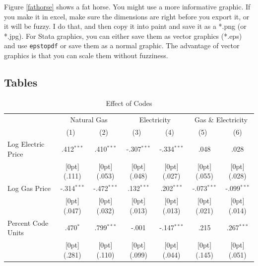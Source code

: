 \documentclass[10pt]{article}
\begin{document}
Figure \ref{fathorse} shows a fat horse.  You might use a more informative graphic.  If you make it in excel, make sure the dimensions are right before you export it, or it will be fuzzy.  I do that, and then copy it into paint and save it as a *.png (or *.jpg).  For Stata graphics, you can either save them as vector graphics (*.eps) and use \texttt{epstopdf} or save them as a normal graphic.  The advantage of vector graphics is that you can scale them without fuzziness.

\subsection{Tables}

\begin{table}[h!]\footnotesize
\caption{Effect of Codes}
\label{main}
\begin{tabular*}{\textwidth}{@{\extracolsep{\fill}}lcccccc}	\toprule	
& \multicolumn{2}{c}{Natural Gas} &	\multicolumn{2}{c}{Electricity} &	\multicolumn{2}{c}{Gas \& Electricity} \\				
\cmidrule{2-7}						
	& \multicolumn{1}{c}{(1)\mbox{\ }} &	\multicolumn{1}{c}{(2)\mbox{\ }} &	\multicolumn{1}{c}{(3)\mbox{\ }} &	\multicolumn{1}{c}{(4)\mbox{\ }} &	\multicolumn{1}{c}{(5)\mbox{\ }} &	\multicolumn{1}{c}{(6)} \\
\midrule					
Log Electric Price &	.412$^{***}$ &	.410$^{***}$ &	-.307$^{***}$ &	-.334$^{***}$ &	.048 &	.028 \\
&	\raisebox{.7ex}[0pt]{\scriptsize (.111)} &	\raisebox{.7ex}[0pt]{\scriptsize (.053)} &	\raisebox{.7ex}[0pt]{\scriptsize (.048)} &	\raisebox{.7ex}[0pt]{\scriptsize (.027)} &	\raisebox{.7ex}[0pt]{\scriptsize (.055)} &	\raisebox{.7ex}[0pt]{\scriptsize (.028)} \\
Log Gas Price &	-.314$^{***}$ &	-.472$^{***}$ &	.132$^{***}$ &	.202$^{***}$ &	-.073$^{***}$ &	-.099$^{***}$ \\
&	\raisebox{.7ex}[0pt]{\scriptsize (.047)} &	\raisebox{.7ex}[0pt]{\scriptsize (.032)} &	\raisebox{.7ex}[0pt]{\scriptsize (.013)} &	\raisebox{.7ex}[0pt]{\scriptsize (.013)} &	\raisebox{.7ex}[0pt]{\scriptsize (.021)} &	\raisebox{.7ex}[0pt]{\scriptsize (.014)} \\
Percent Code Units &	.470$^{*}$ &	.799$^{***}$ &	-.001 &	-.147$^{***}$ &	.215 &	.267$^{***}$ \\
&	\raisebox{.7ex}[0pt]{\scriptsize (.281)} &	\raisebox{.7ex}[0pt]{\scriptsize (.110)} &	\raisebox{.7ex}[0pt]{\scriptsize (.099)} &	\raisebox{.7ex}[0pt]{\scriptsize (.044)} &	\raisebox{.7ex}[0pt]{\scriptsize (.145)} &	\raisebox{.7ex}[0pt]{\scriptsize (.051)} \\

\end{tabular*}
\end{table}
\end{document}
